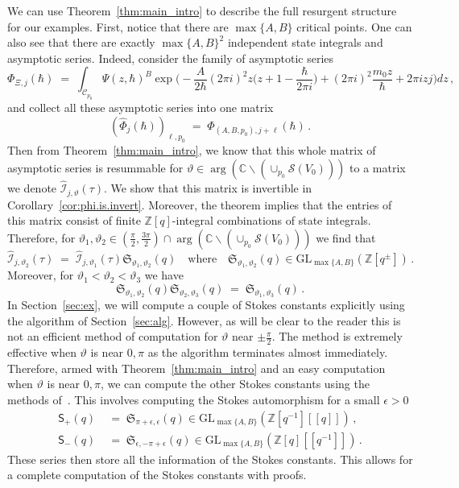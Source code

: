 \documentclass[12pt,reqno]{amsart}
\theoremstyle{definition}
\def\BZ{\mathbb Z}
\def\BC{\mathbb C}
\def\calI{\mathcal I}
\def\calC{\mathcal C}
\def\calS{\mathcal S}
\def\be{\begin{equation}}
\def\ee{\end{equation}}
\def\GL{\mathrm{GL}}
\renewcommand{\=}{\;=\;}
\begin{document}
%
We can use Theorem~\ref{thm:main_intro} to describe the full resurgent structure for our examples. First, notice that there are $\max\{A,B\}$ critical points. One can also see that there are exactly $\max\{A,B\}^2$ independent state integrals and asymptotic series. Indeed, consider the family of asymptotic series
\be
  \Phi_{\Xi,j}(\hbar)
  \=
  \int_{\calC_{p_0}} \Psi(z,\hbar)^B\exp\Big(-\frac{A}{2\hbar}(2\pi i)^2z\Big(z+1-\frac{\hbar}{2\pi i}\Big)+(2\pi i)^2\frac{m_0z}{\hbar}+2\pi izj\Big)dz\,,
\ee
and collect all these asymptotic series into one matrix
\be\label{eq:phimat}
  (\widehat{\Phi}_j(\hbar))_{\ell,p_0}
  \=
  \Phi_{(A,B,p_0),j+\ell}(\hbar)\,.
\ee
Then from Theorem~\ref{thm:main_intro}, we know that this whole matrix of asymptotic series is resummable for $\vartheta\in\arg(\BC\backslash(\cup_{p_0}\calS(V_0)))$ to a matrix we denote $\widehat{\calI}_{j,\vartheta}(\tau)$. We show that this matrix is invertible in Corollary~\ref{cor:phi.is.invert}. Moreover, the theorem implies that the entries of this matrix consist of finite $\BZ[q]$-integral combinations of state integrals. Therefore, for $\vartheta_1,\vartheta_2\in(\tfrac{\pi}{2},\tfrac{3\pi}{2})\cap\arg(\BC\backslash(\cup_{p_0}\calS(V_0)))$ we find that
\be
  \widehat{\calI}_{j,\vartheta_2}(\tau)
  \=
  \widehat{\calI}_{j,\vartheta_1}(\tau)
  \mathfrak{S}_{\vartheta_1,\vartheta_2}(q)
\quad\text{where}\quad
  \mathfrak{S}_{\vartheta_1,\vartheta_2}(q)
  \in
  \GL_{\max\{A,B\}}(\BZ[q^{\pm}])\,.
\ee
Moreover, for $\vartheta_1<\vartheta_2<\vartheta_3$ we have
\be
  \mathfrak{S}_{\vartheta_1,\vartheta_2}(q)
  \mathfrak{S}_{\vartheta_2,\vartheta_3}(q)
  \=
  \mathfrak{S}_{\vartheta_1,\vartheta_3}(q)\,.
\ee
 In Section~\ref{sec:ex}, we will compute a couple of Stokes constants explicitly using the algorithm of Section~\ref{sec:alg}. However, as will be clear to the reader this is not an efficient method of computation for $\vartheta$ near $\pm\tfrac{\pi}{2}$. The method is extremely effective when $\vartheta$ is near $0,\pi$ as the algorithm terminates almost immediately. Therefore, armed with Theorem~\ref{thm:main_intro} and an easy computation when $\vartheta$ is near $0,\pi$, we can compute the other Stokes constants using the methods of~\cite{GGM:I}. This involves computing the Stokes automorphism for a small $\epsilon>0$
\be
\begin{aligned}
  \mathsf{S}_+(q)
  &\=
  \mathfrak{S}_{\pi+\epsilon,\epsilon}(q)\in\GL_{\max\{A,B\}}(\BZ[q^{-1}][\![q]\!])\,,\\
  \mathsf{S}_-(q)
  &\=
  \mathfrak{S}_{\epsilon,-\pi+\epsilon}(q)\in\GL_{\max\{A,B\}}(\BZ[q][\![q^{-1}]\!])\,.
\end{aligned}
\ee
These series then store all the information of the Stokes constants. This allows for a complete computation of the Stokes constants with proofs.
\end{document}
